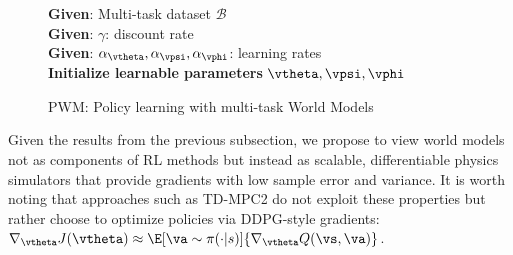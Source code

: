 \documentclass{article} %
\begin{document}
\begin{figure}
    \vspace{-0.175in}
    \begin{algorithm}[H]
       \caption{PWM: Policy learning with multi-task World Models}
       \label{alg:algo}
        \textbf{Given}: Multi-task dataset $\mathcal{B}$ \\
        \textbf{Given}: $\gamma$: discount rate \\
        \textbf{Given}: $\alpha_\vtheta, \alpha_\vpsi, \alpha_\vphi$: learning rates \\
        \textbf{Initialize learnable parameters} $\vtheta, \vpsi, \vphi$ \\
    \end{algorithm}
\end{figure}

Given the results from the previous subsection, we propose to view world models not as components of RL methods but instead as scalable, differentiable physics simulators that provide gradients with low sample error and variance. It is worth noting that approaches such as TD-MPC2 \citet{hansen2023td} do not exploit these properties but rather choose to optimize policies via DDPG-style gradients: \\ $\nabla_\vtheta J(\vtheta) \approx \E[\va \sim \pi (\cdot | s)]{\nabla_\vtheta Q(\vs,\va)}$.
\end{document}

